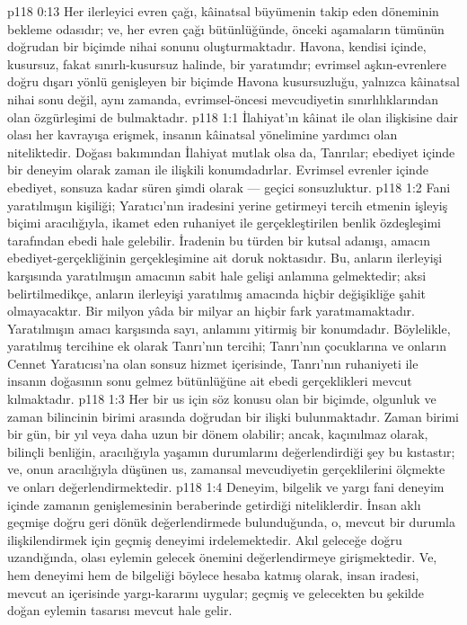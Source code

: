 \vs p118 0:13 Her ilerleyici evren çağı, kâinatsal büyümenin takip eden döneminin bekleme odasıdır; ve, her evren çağı bütünlüğünde, önceki aşamaların tümünün doğrudan bir biçimde nihai sonunu oluşturmaktadır. Havona, kendisi içinde, kusursuz, fakat sınırlı\hyp{}kusursuz halinde, bir yaratımdır; evrimsel aşkın\hyp{}evrenlere doğru dışarı yönlü genişleyen bir biçimde Havona kusursuzluğu, yalnızca kâinatsal nihai sonu değil, aynı zamanda, evrimsel\hyp{}öncesi mevcudiyetin sınırlılıklarından olan özgürleşimi de bulmaktadır.
\vs p118 1:1 İlahiyat’ın kâinat ile olan ilişkisine dair olası her kavrayışa erişmek, insanın kâinatsal yönelimine yardımcı olan niteliktedir. Doğası bakımından İlahiyat mutlak olsa da, Tanrılar; ebediyet içinde bir deneyim olarak zaman ile ilişkili konumdadırlar. Evrimsel evrenler içinde ebediyet, sonsuza kadar süren şimdi olarak --- geçici sonsuzluktur.
\vs p118 1:2 Fani yaratılmışın kişiliği; Yaratıcı’nın iradesini yerine getirmeyi tercih etmenin işleyiş biçimi aracılığıyla, ikamet eden ruhaniyet ile gerçekleştirilen benlik özdeşleşimi tarafından ebedi hale gelebilir. İradenin bu türden bir kutsal adanışı, amacın ebediyet\hyp{}gerçekliğinin gerçekleşimine ait doruk noktasıdır. Bu, anların ilerleyişi karşısında yaratılmışın amacının sabit hale gelişi anlamına gelmektedir; aksi belirtilmedikçe, anların ilerleyişi yaratılmış amacında hiçbir değişikliğe şahit olmayacaktır. Bir milyon yâda bir milyar an hiçbir fark yaratmamaktadır. Yaratılmışın amacı karşısında sayı, anlamını yitirmiş bir konumdadır. Böylelikle, yaratılmış tercihine ek olarak Tanrı’nın tercihi; Tanrı’nın çocuklarına ve onların Cennet Yaratıcısı’na olan sonsuz hizmet içerisinde, Tanrı’nın ruhaniyeti ile insanın doğasının sonu gelmez bütünlüğüne ait ebedi gerçeklikleri mevcut kılmaktadır.
\vs p118 1:3 Her bir us için söz konusu olan bir biçimde, olgunluk ve zaman bilincinin birimi arasında doğrudan bir ilişki bulunmaktadır. Zaman birimi bir gün, bir yıl veya daha uzun bir dönem olabilir; ancak, kaçınılmaz olarak, bilinçli benliğin, aracılığıyla yaşamın durumlarını değerlendirdiği şey bu kıstastır; ve, onun aracılığıyla düşünen us, zamansal mevcudiyetin gerçeklilerini ölçmekte ve onları değerlendirmektedir.
\vs p118 1:4 Deneyim, bilgelik ve yargı fani deneyim içinde zamanın genişlemesinin beraberinde getirdiği niteliklerdir. İnsan aklı geçmişe doğru geri dönük değerlendirmede bulunduğunda, o, mevcut bir durumla ilişkilendirmek için geçmiş deneyimi irdelemektedir. Akıl geleceğe doğru uzandığında, olası eylemin gelecek önemini değerlendirmeye girişmektedir. Ve, hem deneyimi hem de bilgeliği böylece hesaba katmış olarak, insan iradesi, mevcut an içerisinde yargı\hyp{}kararını uygular; geçmiş ve gelecekten bu şekilde doğan eylemin tasarısı mevcut hale gelir.
